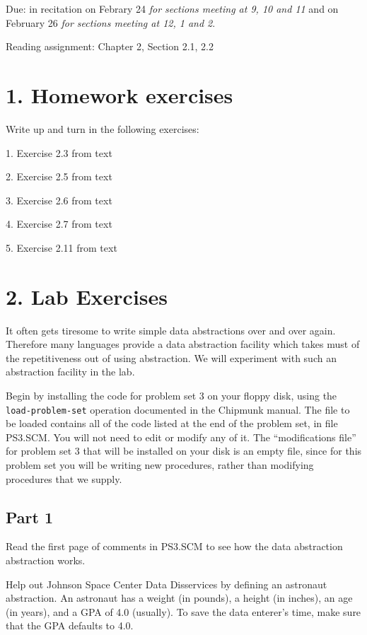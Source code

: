 \vpar
Due: in recitation on Febrary 24 {\it for sections meeting at 9, 10 and
11} and on February 26 {\it for sections meeting at 12, 1 and 2}.


\vpar
Reading assignment:  Chapter 2, Section 2.1, 2.2

\chapter{1. Homework exercises}

Write up and turn in the following exercises:

1. Exercise 2.3 from text

2. Exercise 2.5 from text

3. Exercise 2.6 from text

4. Exercise 2.7 from text

5. Exercise 2.11 from text


\chapter{ 2. Lab Exercises}

It often gets tiresome to write simple data abstractions over and over
again.  Therefore many languages provide a data abstraction facility
which takes must of the repetitiveness out of using abstraction.
We will experiment with such an abstraction facility in the lab.

Begin by installing the code for problem set 3 on your floppy disk,
using the {\tt load-problem-set} operation documented in the Chipmunk
manual.  The file to be loaded contains all of the code listed at the
end of the problem set, in file PS3.SCM.  You will not need to edit or
modify any of it.  The ``modifications file'' for problem set 3 that
will be installed on your disk is an empty file, since for this problem
set you will be writing new procedures, rather than modifying procedures
that we supply.

\section{Part 1}

Read the first page of comments in PS3.SCM to see how the data
abstraction abstraction works.

Help out Johnson Space Center Data Disservices by defining an astronaut
abstraction.  An astronaut has a weight (in pounds), a height (in
inches), an age (in years), and a GPA of 4.0 (usually).  To save
the data enterer's time, make sure that the GPA defaults to 4.0.

